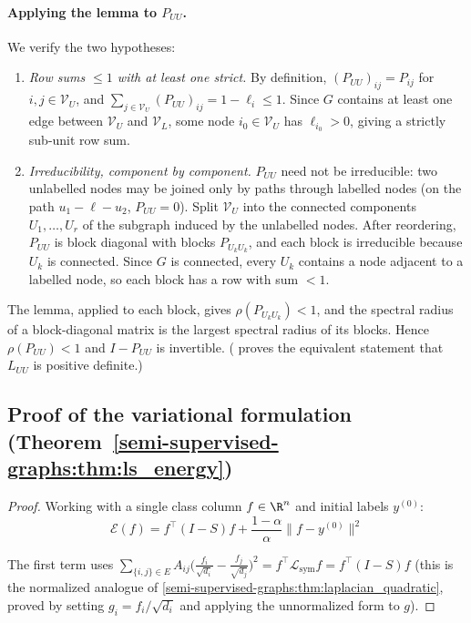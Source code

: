 \begin{notechapter}
\paragraph{Applying the lemma to $P_{UU}$.}
We verify the two hypotheses:
\begin{enumerate}
  \item \emph{Row sums $\leq 1$ with at least one strict.}
    By definition, $(P_{UU})_{ij} = P_{ij}$ for $i,j \in \mathcal{V}_U$, and
    $\sum_{j \in \mathcal{V}_U}(P_{UU})_{ij} = 1 - \ell_i \leq 1$.  Since $G$
    contains at least one edge between $\mathcal{V}_U$ and $\mathcal{V}_L$,
    some node $i_0 \in \mathcal{V}_U$ has $\ell_{i_0} > 0$, giving a strictly
    sub-unit row sum.
  \item \emph{Irreducibility, component by component.}
    $P_{UU}$ need not be irreducible: two unlabelled nodes may be joined only by paths through labelled nodes (on the path $u_1 - \ell - u_2$, $P_{UU} = 0$). Split $\mathcal V_U$ into the connected components $U_1, \ldots, U_r$ of the subgraph induced by the unlabelled nodes. After reordering, $P_{UU}$ is block diagonal with blocks $P_{U_kU_k}$, and each block is irreducible because $U_k$ is connected. Since $G$ is connected, every $U_k$ contains a node adjacent to a labelled node, so each block has a row with sum $< 1$.
\end{enumerate}
The lemma, applied to each block, gives $\rho(P_{U_kU_k}) < 1$, and the spectral radius of a block-diagonal matrix is the largest spectral radius of its blocks. Hence $\rho(P_{UU}) < 1$ and $I - P_{UU}$ is invertible. ( proves the equivalent statement that $L_{UU}$ is positive definite.)


\subsection{Proof of the variational formulation (Theorem~\ref{semi-supervised-graphs:thm:ls_energy})}
\label{semi-supervised-graphs:app:ls_energy}

\begin{proof}
Working with a single class column $f \in \R^n$ and initial labels
$y^{(0)}$:
\begin{equation}
\mathcal{E}(f) = f^\top(I - S)f + \frac{1-\alpha}{\alpha}\|f - y^{(0)}\|^2
\end{equation}

The first term uses $\sum_{\{i,j\}\in E}A_{ij}\bigl(\frac{f_i}{\sqrt{d_i}} -
\frac{f_j}{\sqrt{d_j}}\bigr)^2 = f^\top\mathcal{L}_{\mathrm{sym}}f
= f^\top(I-S)f$ (this is the normalized analogue of
\cref{semi-supervised-graphs:thm:laplacian_quadratic}, proved by setting $g_i = f_i/\sqrt{d_i}$
and applying the unnormalized form to $g$).


\end{proof}
\end{notechapter}
